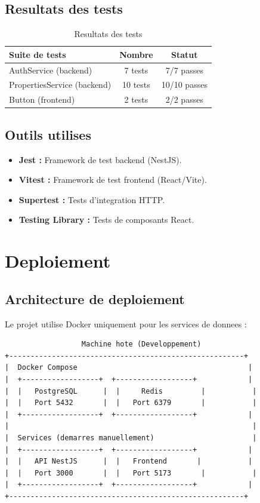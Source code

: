 \documentclass[12pt,a4paper]{report}
\begin{document}
\section{Resultats des tests}

\begin{table}[H]
\centering
\begin{tabular}{|l|c|c|}
\hline
\textbf{Suite de tests} & \textbf{Nombre} & \textbf{Statut} \\
\hline
AuthService (backend) & 7 tests & 7/7 passes \\
\hline
PropertiesService (backend) & 10 tests & 10/10 passes \\
\hline
Button (frontend) & 2 tests & 2/2 passes \\
\hline
\end{tabular}
\caption{Resultats des tests}
\end{table}

\section{Outils utilises}

\begin{itemize}
  \item \textbf{Jest :} Framework de test backend (NestJS).
  \item \textbf{Vitest :} Framework de test frontend (React/Vite).
  \item \textbf{Supertest :} Tests d'integration HTTP.
  \item \textbf{Testing Library :} Tests de composants React.
\end{itemize}

\chapter{Deploiement}

\section{Architecture de deploiement}

Le projet utilise Docker uniquement pour les services de donnees :

\begin{verbatim}
                  Machine hote (Developpement)
+-------------------------------------------------------+
|  Docker Compose                                        |
|  +------------------+  +------------------+            |
|  |   PostgreSQL      |  |     Redis         |           |
|  |   Port 5432       |  |   Port 6379       |           |
|  +------------------+  +------------------+            |
|                                                         |
|  Services (demarres manuellement)                       |
|  +------------------+  +------------------+            |
|  |   API NestJS      |  |   Frontend       |           |
|  |   Port 3000       |  |   Port 5173       |           |
|  +------------------+  +------------------+            |
+-------------------------------------------------------+
\end{verbatim}
\end{document}
